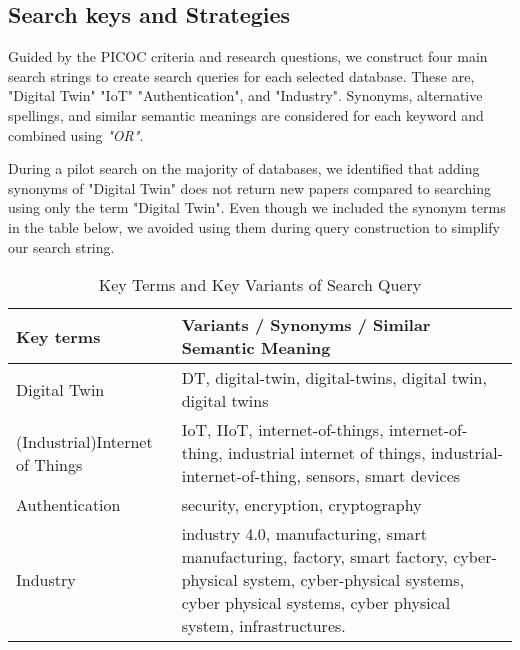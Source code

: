 \subsection{Search keys and Strategies}
Guided by the PICOC criteria and research questions, we construct four main search strings to create search queries for each selected database. These are, "Digital Twin" "IoT" "Authentication", and "Industry". Synonyms, alternative spellings, and similar semantic meanings are considered for each keyword and combined using \textit{"OR"}. 

During a pilot search on the majority of databases, we identified that adding synonyms of "Digital Twin" does not return new papers compared to searching using only the term "Digital Twin". Even though we included the synonym terms in the table below, we avoided using them during query construction to simplify our search string.

\begin{table}[h]
\caption{ Key Terms and Key Variants of Search Query}
\begin{NiceTabular}{p{3.2cm}p{11cm}}
\toprule
    \textbf{Key terms} & \textbf{Variants / Synonyms / Similar Semantic Meaning} \\
    \midrule
    Digital Twin & DT, digital-twin, digital-twins, digital twin, digital twins \\ \hline
    (Industrial)Internet of Things & IoT, IIoT, internet-of-things, internet-of-thing, industrial internet of things, industrial-internet-of-thing, sensors, smart devices  \\ \hline
    Authentication & security, encryption, cryptography\\ \hline
    Industry & industry 4.0, manufacturing, smart manufacturing, factory, smart factory, cyber-physical system, cyber-physical systems, cyber physical systems, cyber physical system, infrastructures. \\ 
\bottomrule
\end{NiceTabular}
\end{table}
